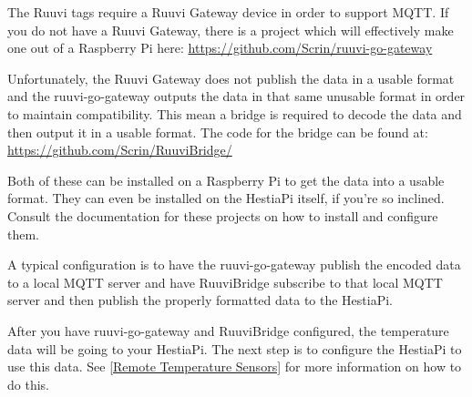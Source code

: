 The Ruuvi tags require a Ruuvi Gateway device in order to support MQTT. If you
do not have a Ruuvi Gateway, there is a project which will effectively make
one out of a Raspberry Pi here: \url{https://github.com/Scrin/ruuvi-go-gateway}

Unfortunately, the Ruuvi Gateway does not publish the data in a usable format
and the ruuvi-go-gateway outputs the data in that same unusable format in
order to maintain compatibility.  This mean a bridge is required to decode the
data and then output it in a usable format.  The code for the bridge can be
found at: \url{https://github.com/Scrin/RuuviBridge/}

Both of these can be installed on a Raspberry Pi to get the data into a usable
format. They can even be installed on the HestiaPi itself, if you're so
inclined. Consult the documentation for these projects on how to install and
configure them.

A typical configuration is to have the ruuvi-go-gateway publish the encoded
data to a local MQTT server and have RuuviBridge subscribe to that local MQTT
server and then publish the properly formatted data to the HestiaPi.

After you have ruuvi-go-gateway and RuuviBridge configured, the temperature
data will be going to your HestiaPi. The next step is to configure the HestiaPi
to use this data. See \ref{Remote Temperature Sensors} for more information on
how to do this.
